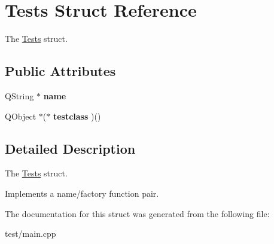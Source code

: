 \hypertarget{structTests}{\section{Tests Struct Reference}
\label{structTests}
}


The \hyperlink{structTests}{Tests} struct.  


\subsection*{Public Attributes}
\begin{DoxyCompactItemize}
\item 
\hypertarget{structTests_a47c01ad9d14a5cd2c7ee1f25275de481}{Q\+String $\ast$ {\bfseries name}}\label{structTests_a47c01ad9d14a5cd2c7ee1f25275de481}

\item 
\hypertarget{structTests_a4b3bb783b13de3997a0174e58391c0e2}{Q\+Object $\ast$($\ast$ {\bfseries testclass} )()}\label{structTests_a4b3bb783b13de3997a0174e58391c0e2}

\end{DoxyCompactItemize}


\subsection{Detailed Description}
The \hyperlink{structTests}{Tests} struct. 

Implements a name/factory function pair. 

The documentation for this struct was generated from the following file\+:\begin{DoxyCompactItemize}
\item 
test/main.\+cpp\end{DoxyCompactItemize}
